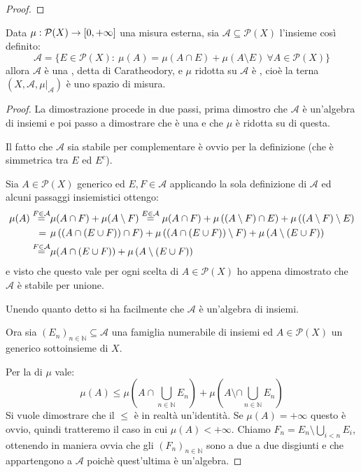 \begin{proof}
\end{proof}


\begin{theorem}\label{EstensioneCaratheodory}
	Data $\mu:\mathcal P(X)\to [0,+\infty]$ una misura esterna, sia $\mathcal A\subseteq \mathcal P(X)$ l'insieme così definito:
	\begin{equation*}
		\mathcal A=\{E\in\mathcal P(X):\ \mu(A)=\mu(A\cap E)+\mu(A\setminus E)\ \forall A\in \mathcal P(X)\}
	\end{equation*}
	allora $\mathcal A$ è una \sigalg{}, detta \sigalg{} di Caratheodory, e $\mu$ ridotta su $\mathcal A$ è \sigadd{}, cioè la terna $(X,\mathcal A,\mu|_{\mathcal A})$ è uno spazio di misura.
\end{theorem}
\begin{proof}
	La dimostrazione procede in due passi, prima dimostro che $\mathcal A$ è un'algebra di insiemi e poi passo a dimostrare che è una \sigalg{} e che $\mu$ è \sigadd{} ridotta su di questa.
	
	Il fatto che $\mathcal A$ sia stabile per complementare è ovvio per la definizione (che è simmetrica tra $E$ ed $E^c$).
	
	Sia $A\in\mathcal P(X)$ generico ed $E,F\in\mathcal A$ applicando la sola definizione di $\mathcal A$ ed alcuni passaggi insiemistici ottengo:
	\begin{align*}
		\mu(A)\stackrel{F\in\mathcal A}{=}&\mu(A\cap F)+\mu(A\setminus F)\stackrel{E\in\mathcal A}{=}
		\mu(A\cap F)+\mu\left((A\setminus F)\cap E\right)+\mu\left((A\setminus F)\setminus E\right)\\
		=\hspace{0.4em}&\mu\left((A\cap (E\cup F))\cap F\right)+\mu\left((A\cap (E\cup F))\setminus F\right)+
		\mu\left(A\setminus(E\cup F)\right)\\
		\stackrel{F\in\mathcal A}{=}&\mu(A\cap (E\cup F))+\mu\left(A\setminus(E\cup F)\right)
	\end{align*}
	e visto che questo vale per ogni scelta di $A\in\mathcal P(X)$ ho appena dimostrato che $\mathcal A$ è stabile per unione.
	
	Unendo quanto detto si ha facilmente che $\mathcal A$ è un'algebra di insiemi.
	
	Ora sia $(E_n)_{n\in\mathbb N}\subseteq \mathcal A$ una famiglia numerabile di insiemi ed $A\in\mathcal P(X)$ un generico sottoinsieme di $X$.
	
	Per la \sigsubadd[ità] di $\mu$ vale:
	\begin{equation}\label{DisuguaglianzaFacileCaratheodory}
		\mu(A)\le \mu\left(A\cap\bigcup_{n\in\mathbb N} E_n\right)+\mu\left(A\setminus\cap\bigcup_{n\in\mathbb N} E_n\right)
	\end{equation}
	Si vuole dimostrare che il $\le$ è in realtà un'identità. Se $\mu(A)=+\infty$ questo è ovvio, quindi tratteremo il caso in cui $\mu(A)<+\infty$. Chiamo $F_n=E_n\setminus \bigcup_{i<n} E_i$, ottenendo in maniera ovvia che gli $(F_n)_{n\in\mathbb N}$ sono a due a due disgiunti e che appartengono a $\mathcal A$ poichè quest'ultima è un'algebra.
	

\end{proof}
